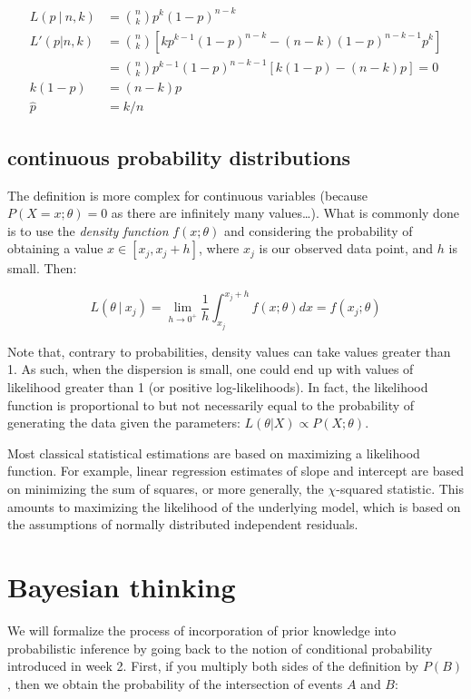 \documentclass[
  letterpaper,
  DIV=11,
  numbers=noendperiod]{scrreprt}
\begin{document}
\[ 
\begin{aligned}
L(p  \ \vert \ n, k) &= {n \choose k} p^k (1-p)^{n-k} \\ \hline
L'(p | n, k ) &= {n \choose k}\left [ kp^{k-1}(1-p)^{n-k} - (n-k) (1-p)^{n-k-1}p^k \right] \\
&={n \choose k} p^{k-1} (1-p)^{n-k-1} \left [ k(1-p) - (n-k)p \right] = 0 \\
\hline
k(1-p) &= (n-k)p \\
\hat p &= k/n
\end{aligned}
\]

\subsection{continuous probability
distributions}\label{continuous-probability-distributions}

The definition is more complex for continuous variables (because
\(P(X = x; \theta) = 0\) as there are infinitely many values\ldots).
What is commonly done is to use the \emph{density function}
\(f(x; \theta)\) and considering the probability of obtaining a value
\(x \in [x_j, x_j + h]\), where \(x_j\) is our observed data point, and
\(h\) is small. Then:

\[
L(\theta \ \vert \ x_j) = \lim_{h \to 0^+} \frac{1}{h} \int_{x_j}^{x_j + h} f(x ; \theta) dx = f(x_j ; \theta)
\]

Note that, contrary to probabilities, density values can take values
greater than 1. As such, when the dispersion is small, one could end up
with values of likelihood greater than 1 (or positive log-likelihoods).
In fact, the likelihood function is proportional to but not necessarily
equal to the probability of generating the data given the parameters:
\(L(\theta\vert X) \propto P(X; \theta)\).

Most classical statistical estimations are based on maximizing a
likelihood function. For example, linear regression estimates of slope
and intercept are based on minimizing the sum of squares, or more
generally, the \(\chi\)-squared statistic. This amounts to maximizing
the likelihood of the underlying model, which is based on the
assumptions of normally distributed independent residuals.

\section{Bayesian thinking}\label{bayesian-thinking}

We will formalize the process of incorporation of prior knowledge into
probabilistic inference by going back to the notion of conditional
probability introduced in week 2. First, if you multiply both sides of
the definition by \(P(B)\), then we obtain the probability of the
intersection of events \(A\) and \(B\):
\end{document}
